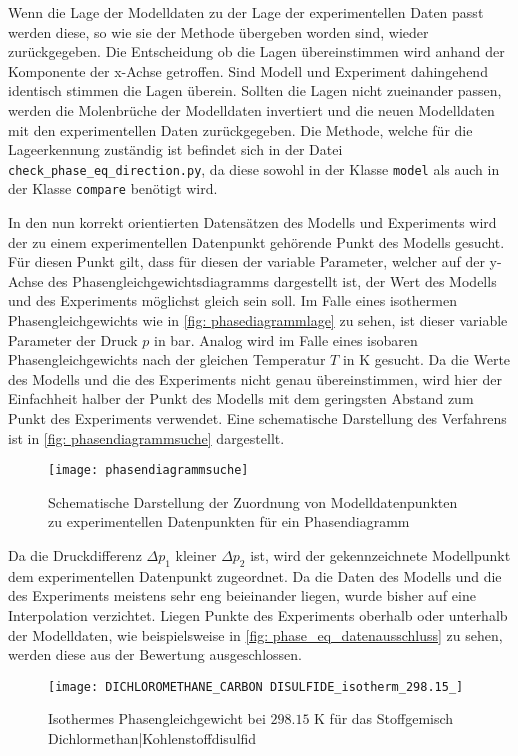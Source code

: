 \documentclass[../thesis.tex]{subfiles}
\begin{document}
Wenn die Lage der Modelldaten zu der Lage der experimentellen Daten passt werden diese, so wie sie der Methode übergeben worden sind, wieder zurückgegeben. Die Entscheidung ob die Lagen übereinstimmen wird anhand der Komponente der x-Achse getroffen. Sind Modell und Experiment dahingehend identisch stimmen die Lagen überein. Sollten die Lagen nicht zueinander passen, werden die Molenbrüche der Modelldaten invertiert und die neuen Modelldaten mit den experimentellen Daten zurückgegeben. Die Methode, welche für die Lageerkennung zuständig ist befindet sich in der Datei \texttt{check\_phase\_eq\_direction.py}, da diese sowohl in der Klasse \texttt{model} als auch in der Klasse \texttt{compare} benötigt wird.

In den nun korrekt orientierten Datensätzen des Modells und Experiments wird der zu einem experimentellen Datenpunkt gehörende Punkt des Modells gesucht. Für diesen Punkt gilt, dass für diesen der variable Parameter, welcher auf der y-Achse des Phasengleichgewichtsdiagramms dargestellt ist, der Wert des Modells und des Experiments möglichst gleich sein soll. Im Falle eines isothermen Phasengleichgewichts wie in \autoref{fig: phasediagrammlage} zu sehen, ist dieser variable Parameter der Druck $ p $ in bar. Analog wird im Falle eines isobaren Phasengleichgewichts nach der gleichen Temperatur $ T $ in K gesucht. Da die Werte des Modells und die des Experiments nicht genau übereinstimmen, wird hier der Einfachheit halber der Punkt des Modells mit dem geringsten Abstand zum Punkt des Experiments verwendet. Eine schematische Darstellung des Verfahrens ist in \autoref{fig: phasendiagrammsuche} dargestellt. 

\begin{figure}[htb]
	\centering
	\texttt{[image: phasendiagrammsuche]}
	\caption{Schematische Darstellung der Zuordnung von Modelldatenpunkten zu experimentellen Datenpunkten für ein Phasendiagramm}
	\label{fig: phasendiagrammsuche}
\end{figure}

Da die Druckdifferenz $\Delta p_1$ kleiner $ \Delta p_2$ ist, wird der gekennzeichnete Modellpunkt dem experimentellen Datenpunkt zugeordnet. Da die Daten des Modells und die des Experiments meistens sehr eng beieinander liegen, wurde bisher auf eine Interpolation verzichtet. Liegen Punkte des Experiments oberhalb oder unterhalb der Modelldaten, wie beispielsweise in \autoref{fig: phase_eq_datenausschluss} zu sehen, werden diese aus der Bewertung ausgeschlossen. 

\begin{figure}[htb]
	\centering
	\texttt{[image: DICHLOROMETHANE\_CARBON DISULFIDE\_isotherm\_298.15\_]}
	\caption{Isothermes Phasengleichgewicht bei $ 298$.$15$ K für das Stoffgemisch Dichlormethan|Kohlenstoffdisulfid}
	\label{fig: phase_eq_datenausschluss}
\end{figure}
\end{document}

